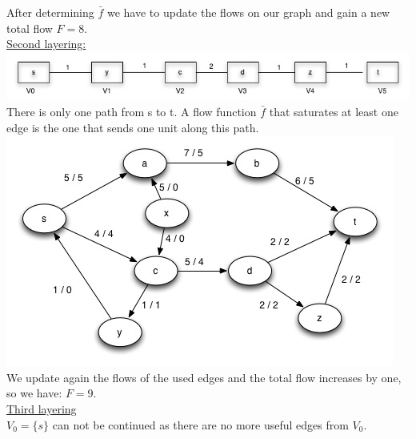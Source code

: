 \begin{example}
After determining $\bar{f}$ we have to update the flows on our graph and gain a new total flow $F=8$. \\
\underline{Second layering:} \\
\includegraphics{diagrams/Chapter3_Example_6_Layering2.jpg} \\ 
There is only one path from s to t. A flow function $\bar{f}$ that saturates at least one edge is the one that sends one unit along this path. \\
\includegraphics{diagrams/Chapter3_Example6_V3.jpg} \\
We update again the flows of the used edges and the total flow increases by one, so we have: $F=9$. \\
\underline{Third layering} \\
$V_0 = \{s\}$ can not be continued as there are no more useful edges from $V_0$.
\end{example}

